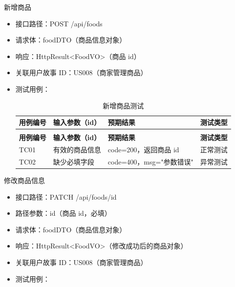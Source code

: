 \begin{levellist}
\begin{levellist}
        \item 新增商品
        \begin{itemize}
            \item 接口路径：POST /api/foods
            \item 请求体：foodDTO（商品信息对象）
            \item 响应：HttpResult<FoodVO>（商品 id）
            \item 关联用户故事 ID：US008（商家管理商品）
            \item 测试用例：
                  \begin{longtable}{>{\centering\arraybackslash}m{1.7cm} >{\centering\arraybackslash}m{3cm} >{\centering\arraybackslash}m{6.3cm} >{\centering\arraybackslash}m{2cm}}

                      \caption{新增商品测试} \label{tab:training}                                   \\

                      \toprule
                      \textbf{用例编号} & \textbf{输入参数（id）} & \textbf{预期结果}       & \textbf{测试类型} \\
                      \midrule
                      \endfirsthead

                      \multicolumn{4}{c}{{\tablename\ \thetable{} 续表}}                        \\
                      \toprule
                      \textbf{用例编号} & \textbf{输入参数（id）} & \textbf{预期结果}       & \textbf{测试类型} \\
                      \midrule
                      \endhead

                      \bottomrule
                      \endfoot

                      TC01          & 有效的商品信息           & code=200，返回商品 id    & 正常测试          \\
                      TC02          & 缺少必填字段            & code=400，msg="参数错误" & 异常测试          \\
                  \end{longtable}
        \end{itemize}


        \item 修改商品信息
        \begin{itemize}
            \item 接口路径：PATCH /api/foods/{id}
            \item 路径参数：id（商品 id，必填）
            \item 请求体：foodDTO（商品信息对象）
            \item 响应：HttpResult<FoodVO>（修改成功后的商品对象）
            \item 关联用户故事 ID：US008（商家管理商品）
            \item 测试用例：
                  \begin{longtable}{>{\centering\arraybackslash}m{1.7cm} >{\centering\arraybackslash}m{3cm} >{\centering\arraybackslash}m{6.3cm} >{\centering\arraybackslash}m{2cm}}


\end{longtable}
\end{itemize}
\end{levellist}
\end{levellist}
